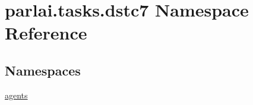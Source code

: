 \hypertarget{namespaceparlai_1_1tasks_1_1dstc7}{}\section{parlai.\+tasks.\+dstc7 Namespace Reference}
\label{namespaceparlai_1_1tasks_1_1dstc7}
\subsection*{Namespaces}
\begin{DoxyCompactItemize}
\item 
 \hyperlink{namespaceparlai_1_1tasks_1_1dstc7_1_1agents}{agents}
\end{DoxyCompactItemize}
